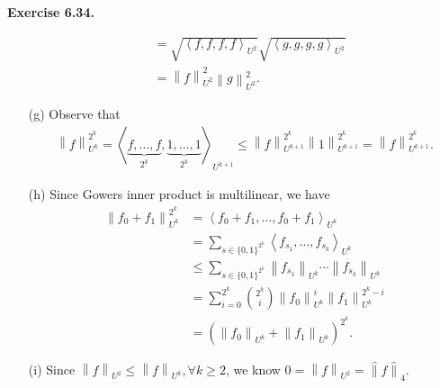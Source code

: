 \documentclass[a4paper]{article}
\newenvironment{exercise}[1]{
	\par
	\noindent\textbf{Exercise #1.}\quad
}{
	\par
	\bigskip
}
\newcommand{\vabs}[1]{{\left\| #1 \right\|}}
\newcommand{\hvabs}[1]{{\hat{\|} #1 \hat{\|}}}
\newcommand{\abra}[1]{{\left\langle #1 \right\rangle}}
\newcommand{\pbra}[1]{{\left( #1 \right)}}
\newcommand{\bin}{{\{0,1\}}}
\begin{document}
\begin{exercise}{6.34}
\begin{itemize}
\begin{align*}
                &=\sqrt{\abra{f,f,f,f}_{U^2}}\sqrt{\abra{g,g,g,g}_{U^2}}\\
                &=\vabs{f}_{U^2}^2\vabs{g}_{U^2}^2.
            \end{align*}
        \item[(g)] Observe that
            \begin{align*}
                \vabs{f}_{U^k}^{2^k}=
                \abra{\underbrace{f,\ldots,f}_{2^k},\underbrace{1,\ldots,1}_{2^k}}_{U^{k+1}}
                \leq\vabs{f}_{U^{k+1}}^{2^k}\vabs{1}_{U^{k+1}}^{2^k}
                =\vabs{f}_{U^{k+1}}^{2^k}.
            \end{align*}
        \item[(h)] Since Gowers inner product is multilinear, we have
            \begin{align*}
                \vabs{f_0+f_1}_{U^k}^{2^k}
                &=\abra{f_0+f_1,\ldots,f_0+f_1}_{U^k}\\
                &=\sum_{s\in\bin^{2^k}}\abra{f_{s_1},\ldots,f_{s_k}}_{U^k}\\
                &\leq\sum_{s\in\bin^{2^k}}\vabs{f_{s_1}}_{U^k}\cdots\vabs{f_{s_k}}_{U^k}\\
                &=\sum_{i=0}^{2^k}\binom{2^k}i\vabs{f_0}_{U^k}^i\vabs{f_1}_{U^k}^{2^k-i}\\
                &=\pbra{\vabs{f_0}_{U^k}+\vabs{f_1}_{U^k}}^{2^k}.
            \end{align*}
        \item[(i)] Since $\vabs{f}_{U^2}\leq\vabs{f}_{U^k},\forall k\geq2$, we know $0=\vabs{f}_{U^2}=\hvabs{f}_4$.
    \end{itemize}
\end{exercise}
\end{document}
